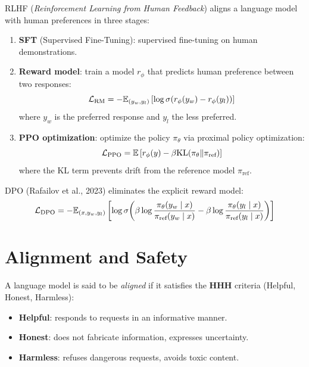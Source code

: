 \begin{definition}[RLHF]
RLHF (\emph{Reinforcement Learning from Human Feedback}) aligns a language
model with human preferences in three stages:
\begin{enumerate}
    \item \textbf{SFT} (Supervised Fine-Tuning): supervised fine-tuning on
          human demonstrations.
    \item \textbf{Reward model}: train a model $r_\phi$ that predicts human
          preference between two responses:
          \[
          \mathcal{L}_{\text{RM}} = -\mathbb{E}_{(y_w, y_l)}\left[\log \sigma(r_\phi(y_w) - r_\phi(y_l))\right]
          \]
          where $y_w$ is the preferred response and $y_l$ the less preferred.
    \item \textbf{PPO optimization}: optimize the policy $\pi_\theta$ via
          proximal policy optimization:
          \[
          \mathcal{L}_{\text{PPO}} = \mathbb{E}\left[r_\phi(y) - \beta \mathrm{KL}(\pi_\theta \| \pi_{\text{ref}})\right]
          \]
          where the KL term prevents drift from the reference model
          $\pi_{\text{ref}}$.
\end{enumerate}
\end{definition}

\begin{keyformulas}[title=\textbf{DPO (Direct Preference Optimization) Objective}]
DPO (Rafailov et al., 2023) eliminates the explicit reward model:
\[
\mathcal{L}_{\text{DPO}} = -\mathbb{E}_{(x, y_w, y_l)}\left[\log \sigma\!\left(\beta \log \frac{\pi_\theta(y_w \mid x)}{\pi_{\text{ref}}(y_w \mid x)} - \beta \log \frac{\pi_\theta(y_l \mid x)}{\pi_{\text{ref}}(y_l \mid x)}\right)\right]
\]
\end{keyformulas}

\section{Alignment and Safety}
\label{sec:ft:alignment}

\begin{definition}
A language model is said to be \emph{aligned} if it satisfies the \textbf{HHH}
criteria (Helpful, Honest, Harmless):
\begin{itemize}
    \item \textbf{Helpful}: responds to requests in an informative manner.
    \item \textbf{Honest}: does not fabricate information, expresses
          uncertainty.
    \item \textbf{Harmless}: refuses dangerous requests, avoids toxic content.
\end{itemize}
\end{definition}

